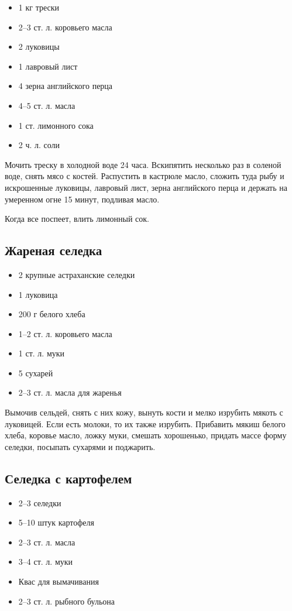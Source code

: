 \begin{itemize} 
	\item  1 кг трески 
    \item  2–3 ст. л. коровьего масла 
    \item  2 луковицы 
    \item  1 лавровый лист 
    \item  4 зерна английского перца 
    \item  4–5 ст. л. масла 
    \item  1 ст. лимонного сока 
    \item  2 ч. л. соли
\end{itemize}

Мочить треску в холодной воде 24 часа. Вскипятить несколько раз в соленой воде, снять мясо с костей. Распустить в кастрюле масло, сложить туда рыбу и искрошенные луковицы, лавровый лист, зерна английского перца и держать на умеренном огне 15 минут, подливая масло.

Когда все поспеет, влить лимонный сок.

\subsection{Жареная селедка}

\begin{itemize} 
	\item  2 крупные астраханские селедки 
    \item  1 луковица 
    \item  200 г белого хлеба 
    \item  1–2 ст. л. коровьего масла 
    \item  1 ст. л. муки 
    \item  5 сухарей 
    \item  2–3 ст. л. масла для жаренья
\end{itemize}

Вымочив сельдей, снять с них кожу, вынуть кости и мелко изрубить мякоть с луковицей. Если есть молоки, то их также изрубить. Прибавить мякиш белого хлеба, коровье масло, ложку муки, смешать хорошенько, придать массе форму селедки, посыпать сухарями и поджарить.

\subsection{Селедка с картофелем}

\begin{itemize} 
	\item  2–3 селедки 
    \item  5–10 штук картофеля 
    \item  2–3 ст. л. масла 
    \item  3–4 ст. л. муки 
    \item  Квас для вымачивания 
    \item  2–3 ст. л. рыбного бульона
\end{itemize}

